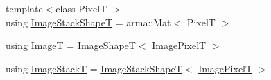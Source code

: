 \begin{DoxyCompactItemize}
\item 
{\footnotesize template$<$class PixelT $>$ }\\using \hyperlink{classmappel_1_1ImageFormat1DBase_ad9d4f0c3d04f3cecf3bf6b4709dcb4a8}{Image\+Stack\+ShapeT} = arma\+::\+Mat$<$ PixelT $>$
\item 
using \hyperlink{classmappel_1_1ImageFormat1DBase_a521a1ff391a52a636fac4aac7c7ba02c}{ImageT} = \hyperlink{classmappel_1_1ImageFormat1DBase_a20d315459b83c348b1465614699783b3}{Image\+ShapeT}$<$ \hyperlink{classmappel_1_1ImageFormat1DBase_a156fe500fd249cb4b77bdb0abc0dd0ea}{Image\+PixelT} $>$
\item 
using \hyperlink{classmappel_1_1ImageFormat1DBase_a81e3246d1c5c37ebf9077b7b5bd25a76}{Image\+StackT} = \hyperlink{classmappel_1_1ImageFormat1DBase_ad9d4f0c3d04f3cecf3bf6b4709dcb4a8}{Image\+Stack\+ShapeT}$<$ \hyperlink{classmappel_1_1ImageFormat1DBase_a156fe500fd249cb4b77bdb0abc0dd0ea}{Image\+PixelT} $>$
\end{DoxyCompactItemize}
